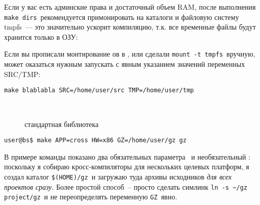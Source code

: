 

Если у вас есть админские права и достаточный объем RAM, после выполнения
\verb|make dirs|\ рекомендуется примонировать на каталоги  и 
файловую систему tmpfs\ --- это значительно ускорит компиляцию, т.к. все
временные файлы будут хранится только в ОЗУ:


Если вы прописали монтирование ов в , или
сделали \verb|mount -t tmpfs|\ вручную, может оказаться нужным запускать
 с явным указанием значений переменных SRC/TMP:

\begin{verbatim}
make blablabla SRC=/home/user/src TMP=/home/user/tmp
\end{verbatim}


\begin{description}
\item[\gnut] \ \\
\item[] стандартная библиотека \\
\end{description}


\begin{verbatim}
user@bs$ make APP=cross HW=x86 GZ=/home/user/gz gz
\end{verbatim}

В примере команды показано два обязательных параметра \ и необязательный : поскольку я собираю
кросс-компиляторы для нескольких целевых платформ, я создал каталог
\verb|$(HOME)/gz|\ и загружаю туда архивы исходников \emph{для всех проектов
сразу}. Более простой способ\ -- просто сделать симлинк
\verb|ln -s ~/gz project/gz|\ и не переопределять переменную \verb|GZ|\ явно.


